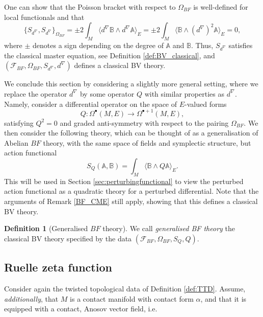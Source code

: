 \documentclass[reqno]{amsart}
\theoremstyle{definition}
\newtheorem{defn}[thm]{Definition}
\theoremstyle{remark}
\newcommand{\A}{\mathbb{A}}
\newcommand{\B}{\mathbb{B}}
\renewcommand{\d}{d^\nabla}
\newcommand{\F}{\mathcal{F}}
\begin{document}
\begin{rmk}
\label{BF_CME}
One can show that the Poisson bracket with respect to $\Omega_{BF}$ is well-defined for local functionals and that
$$\{S_{\d},S_{\d}\}_{\Omega_{BF}} = \pm 2\int_M \langle\d\B\wedge\d\A\rangle_E = \pm 2\int_M \langle\B\wedge(\d)^2\A\rangle_E = 0,$$
where $\pm$ denotes a sign depending on the degree of $\A$ and $\B$. Thus, $S_{\d}$ satisfies the classical master equation, see Definition \ref{def:BV_classical}, and $(\F_{BF},\Omega_{BF},S_{\d},\d)$ defines a classical BV theory.
\end{rmk}



We conclude this section by considering a slightly more general setting, where we replace the operator $\d$ by some operator $Q$ with similar properties as $\d$. Namely, consider a differential operator on the space of $E$-valued forms
$$Q: \Omega^\bullet(M,E) \to \Omega^{\bullet+1}(M,E),$$
satisfying $Q^2 = 0$ and graded anti-symmetry with respect to the pairing $\Omega_{BF}$. We then consider the following theory, which can be thought of as a generalisation of Abelian $BF$ theory, with the same space of fields and symplectic structure, but action functional
$$S_Q(\A,\B) = \int_M \langle\B\wedge Q\A\rangle_E.$$
This will be used in Section \ref{sec:perturbingfunctional} to view the perturbed action functional as a quadratic theory for a perturbed differential. Note that the arguments of Remark \ref{BF_CME} still apply, showing that this defines a classical BV theory.


\begin{defn}[Generalised $BF$ theory]
We call \emph{generalised BF theory} the classical BV theory specified by the data  $(\F_{BF},\Omega_{BF},S_Q,Q)$.
\end{defn}
















\subsection{Ruelle zeta function}\label{sec:Ruellezeta}

Consider again the twisted topological data of Definition \ref{def:TTD}. Assume, \emph{additionally}, that $M$ is a contact manifold with contact form $\alpha$, and that it is equipped with a contact, Anosov vector field, i.e.
\end{document}
